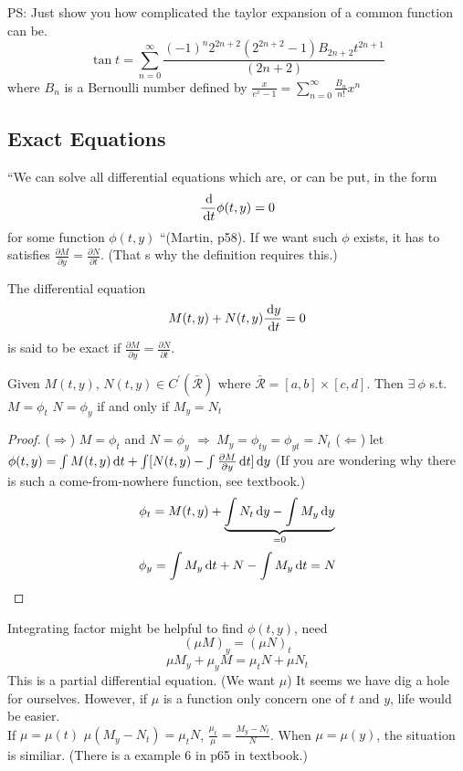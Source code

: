 \begin{remark}
\begin{itemize}
\begin{example}
PS: Just show you how complicated the taylor expansion of a common function can be.
\[\tan t=\sum_{n=0}^{\infty}\frac{(-1)^n2^{2n+2}(2^{2n+2}-1)B_{2n+2}t^{2n+1}}{(2n+2)}
\]
where $B_n$ is a Bernoulli number defined by $\frac{x}{e^x-1}=\sum_{n=0}^{\infty}\frac{B_n}{n!}x^n$
\end{example}
\end{itemize}
\end{remark}
\subsection{Exact Equations}
``We can solve all differential equations which are, or can be put, in the form
\[\frac{\,\mathrm{d}}{\,\mathrm{d} t}\phi(t,y)=0
\]
for some function $\phi(t,y)$
``(Martin, p58).
If we want such $\phi$ exists, it has to satisfies  $\frac{\partial M}{\partial y}=\frac{\partial N}{\partial t}$. (That
s why the definition requires this.) 
\begin{definition}The differential equation
\[M(t,y)+N(t,y)\frac{\,\mathrm{d} y}{\,\mathrm{d} t}=0
\]
is said to be exact if $\frac{\partial M}{\partial y}=\frac{\partial N}{\partial t}$.
\end{definition}
\begin{theorem}
Given $M(t,y)$, $N(t,y)\in C^\prime(\bar{\mathcal{R}})$ where $\bar{\mathcal{R}}=[a,b]\times[c,d]$. Then $\exists~\phi$ s.t. $M=\phi_t$ $N=\phi_y$ if and only if $M_y=N_t$
\end{theorem}
\begin{proof}
($\Rightarrow$) $M=\phi_t$ and $N=\phi_y$ $\Rightarrow~M_y=\phi_{ty}=\phi_{yt}=N_t$ 
($\Leftarrow$)  let $\phi(t,y)=\int M(t,y)\,\mathrm{d} t+\int[N(t,y)-\int\frac{\partial M}{\partial y}\,\mathrm{d} t]\,\mathrm{d} y$ (If you are wondering why there is such a come-from-nowhere function, see textbook.)
\[\phi_t=M(t,y)+\underbrace{\int N_t\,\mathrm{d} y-\int M_y\,\mathrm{d} y}_{=0}
\]
\[\phi_y=\int M_y\,\mathrm{d} t+N-\int M_y\,\mathrm{d} t=N
\]
\end{proof}

Integrating factor might be helpful to find $\phi(t,y)$, need
\[(\mu M)_y=(\mu N)_t
\]
\[\mu M_y+\mu_yM=\mu_tN+\mu N_t
\]
This is a partial differential equation. (We want $\mu$) It seems we have dig a hole for ourselves. However, if $\mu$ is a function only concern one of $t$ and $y$, life would be easier.\\
If $\mu=\mu(t)$ $\mu(M_y-N_t)=\mu_tN$, $\frac{\mu_t}{\mu}=\frac{M_y-N_t}{N}$. When $\mu=\mu(y)$, the situation is similiar. (There is a example 6 in p65 in textbook.)
